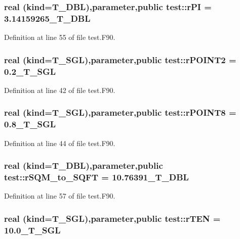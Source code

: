 \hypertarget{namespacetest_a374cf972567d5d75483cb459084f3d4e}{
\subsubsection[{rPI}]{\setlength{\rightskip}{0pt plus 5cm}real (kind={\bf T\_\-DBL}),parameter,public {\bf test::rPI} = 3.14159265\_\-T\_\-DBL}}
\label{namespacetest_a374cf972567d5d75483cb459084f3d4e}


Definition at line 55 of file test.F90.

\hypertarget{namespacetest_af379bbc7038181ce0aee8712e76e9867}{
\subsubsection[{rPOINT2}]{\setlength{\rightskip}{0pt plus 5cm}real (kind={\bf T\_\-SGL}),parameter,public {\bf test::rPOINT2} = 0.2\_\-T\_\-SGL}}
\label{namespacetest_af379bbc7038181ce0aee8712e76e9867}


Definition at line 42 of file test.F90.

\hypertarget{namespacetest_a52a9cf25cf2fc8828b5313923217c3d8}{
\subsubsection[{rPOINT8}]{\setlength{\rightskip}{0pt plus 5cm}real (kind={\bf T\_\-SGL}),parameter,public {\bf test::rPOINT8} = 0.8\_\-T\_\-SGL}}
\label{namespacetest_a52a9cf25cf2fc8828b5313923217c3d8}


Definition at line 44 of file test.F90.

\hypertarget{namespacetest_a3f71bffc4ddb3031cb85b1bbd0731823}{
\subsubsection[{rSQM\_\-to\_\-SQFT}]{\setlength{\rightskip}{0pt plus 5cm}real (kind={\bf T\_\-DBL}),parameter,public {\bf test::rSQM\_\-to\_\-SQFT} = 10.76391\_\-T\_\-DBL}}
\label{namespacetest_a3f71bffc4ddb3031cb85b1bbd0731823}


Definition at line 57 of file test.F90.

\hypertarget{namespacetest_a797e128f57e419a939928fd813fa5ef6}{
\subsubsection[{rTEN}]{\setlength{\rightskip}{0pt plus 5cm}real (kind={\bf T\_\-SGL}),parameter,public {\bf test::rTEN} = 10.0\_\-T\_\-SGL}}
\label{namespacetest_a797e128f57e419a939928fd813fa5ef6}


